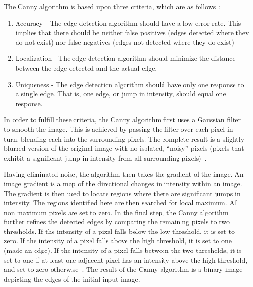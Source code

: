 \documentclass{sig-alternate}
\begin{document}
The Canny algorithm is based upon three criteria, which are as follows~\cite{Canny:1986, CannySummarized}:
\begin{enumerate}
\item Accuracy - The edge detection algorithm should have a low error rate. This implies that there should be neither false positives (edges detected where they do not exist) nor false negatives (edges not detected where they do exist).
\item Localization - The edge detection algorithm should minimize the distance between the edge detected and the actual edge.
\item Uniqueness - The edge detection algorithm should have only one response to a single edge. That is, one edge, or jump in intensity, should equal one response.
\end{enumerate}

In order to fulfill these criteria, the Canny algorithm first uses a Gaussian filter to smooth the image. This is achieved by passing the filter over each pixel in turn, blending each into the surrounding pixels. The complete result is a slightly blurred version of the original image with no isolated, ``noisy'' pixels (pixels that exhibit a significant jump in intensity from all surrounding pixels)~\cite{Canny:1986, CannySummarized}.

Having eliminated noise, the algorithm then takes the gradient of the image. An image gradient is a map of the directional changes in intensity within an image. The gradient is then used to locate regions where there are significant jumps in intensity. The regions identified here are then searched for local maximum. All non maximum pixels are set to zero. In the final step, the Canny algorithm further refines the detected edges by comparing the remaining pixels to two thresholds. If the intensity of a pixel falls below the low threshold, it is set to zero. If the intensity of a pixel falls above the high threshold, it is set to one (made an edge). If the intensity of a pixel falls between the two thresholds, it is set to one if at least one adjacent pixel has an intensity above the high threshold, and set to zero otherwise~\cite{CannySummarized}. The result of the Canny algorithm is a binary image depicting the edges of the initial input image.
\end{document}
